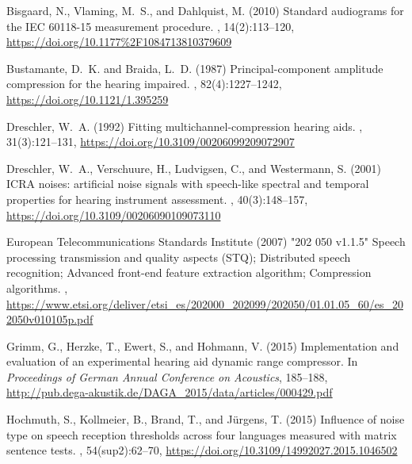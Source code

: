 \documentclass[10pt,a4paper,twocolumn]{article}
\begin{document}
\begin{thebibliography}{}
	Bisgaard, N., Vlaming, M.~S., and Dahlquist, M. (2010)
	\newblock Standard audiograms for the IEC 60118-15 measurement procedure.
	, 14(2):113--120, \url{https://doi.org/10.1177%2F1084713810379609}

	Bustamante, D.~K. and Braida, L.~D. (1987)
	\newblock Principal-component amplitude compression for the hearing impaired.
	, 82(4):1227--1242, \url{https://doi.org/10.1121/1.395259}

	Dreschler, W.~A. (1992)
	\newblock Fitting multichannel-compression hearing aids.
	, 31(3):121--131, \url{https://doi.org/10.3109/00206099209072907}

	Dreschler, W.~A., Verschuure, H., Ludvigsen, C., and Westermann, S. (2001)
	\newblock ICRA noises: artificial noise signals with speech-like spectral and temporal properties for hearing instrument assessment.
	, 40(3):148--157, \url{https://doi.org/10.3109/00206090109073110}

	European Telecommunications Standards Institute (2007)
	\newblock "202 050 v1.1.5" Speech processing transmission and quality aspects (STQ); Distributed speech recognition; Advanced front-end feature extraction algorithm; Compression algorithms.
	, \url{https://www.etsi.org/deliver/etsi_es/202000_202099/202050/01.01.05_60/es_202050v010105p.pdf}

	Grimm, G., Herzke, T., Ewert, S., and Hohmann, V. (2015)
	\newblock Implementation and evaluation of an experimental hearing aid dynamic range compressor.
	\newblock In {\em Proceedings of German Annual Conference on Acoustics}, 185--188, \url{http://pub.dega-akustik.de/DAGA_2015/data/articles/000429.pdf}

	Hochmuth, S., Kollmeier, B., Brand, T., and Jürgens, T. (2015)
	\newblock Influence of noise type on speech reception thresholds across four languages measured with matrix sentence tests.
	, 54(sup2):62--70, \url{https://doi.org/10.3109/14992027.2015.1046502}
	

\end{thebibliography}
\end{document}
